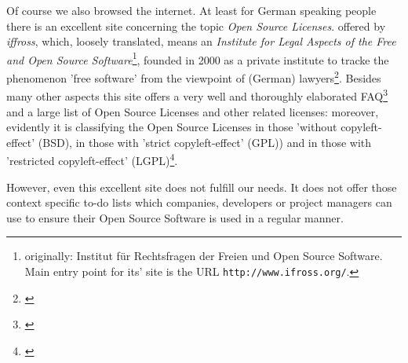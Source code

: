 %
%
%
%

%
Of course we also browsed the internet. At least for German speaking people
there is an excellent site concerning the topic \emph{Open Source Licenses}.
offered by \textit{iffross}, which, loosely translated, means an
\textit{Institute for Legal Aspects of the Free and Open Source
Software}\footnote{originally: \glqq{}Institut für Rechtsfragen der Freien und
Open Source Software\grqq{}. Main entry point for its' site is the URL
\texttt{http://www.ifross.org/}.}, founded in 2000 as a private institute to
tracke the phenomenon 'free software' from the viewpoint of (German)
lawyers\footnote{\cite[cf.][\nopage wp]{ifross2011b}}. Besides many other
aspects this site offers a very well and thoroughly elaborated
FAQ\footnote{\cite[cf.][\nopage wp]{ifross2011c}} and a large list of Open
Source Licenses and other related licenses: moreover, evidently it is
classifying the Open Source Licenses in those 'without copyleft-effect' (BSD),
in those with 'strict copyleft-effect' (GPL)) and in those with 'restricted
copyleft-effect' (LGPL)\footnote{\cite[cf.][\nopage wp]{ifross2011a}}.

However, even this excellent site does not fulfill our needs. It does not offer
those context specific to-do lists which companies, developers or project
managers can use to ensure their Open Source Software is used in a regular
manner.

